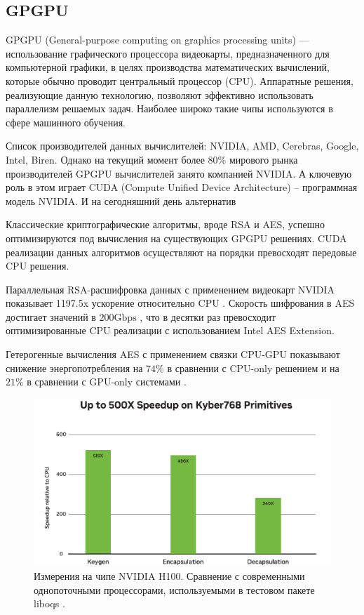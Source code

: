 \documentclass[a4paper,12pt]{article}
\begin{document}
\subsection{GPGPU}

GPGPU (General-purpose computing on graphics processing units) — использование графического процессора видеокарты, предназначенного для компьютерной графики, в целях производства математических вычислений, которые обычно проводит центральный процессор (CPU). Аппаратные решения, реализующие данную технологию, позволяют эффективно использовать параллелизм решаемых задач. Наиболее широко такие чипы используются в сфере машинного обучения.

Список производителей данных вычислителей: NVIDIA, AMD, Cerebras, Google, Intel, Biren. Однако на текущий момент более $80\%$ мирового рынка производителей GPGPU вычислителей занято компанией NVIDIA. А ключевую роль в этом играет CUDA (Compute Unified Device Architecture) -- программная модель NVIDIA. И на сегодняшний день альтернатив

Классические криптографические алгоритмы, вроде RSA и AES, успешно оптимизируются под вычисления на существующих GPGPU решениях. CUDA реализации данных алгоритмов осуществляют на порядки превосходят передовые CPU решения.

Параллельная RSA-расшифровка данных с применением видеокарт NVIDIA показывает 1197.5x ускорение относительно CPU \cite{RSA_CUDA}. Скорость шифрования в AES достигает значений в $200 \text{Gbps}$ \cite{AES_CUDA} \cite{AES_Pascal}, что в десятки раз превосходит оптимизированные CPU реализации с использованием Intel AES Extension. 

Гетерогенные вычисления AES с применением связки CPU-GPU показывают снижение энергопотребления на $74\%$ в сравнении с CPU-only решением и на $21\%$ в сравнении с GPU-only системами \cite{GPGPU_EnergyEfficiency}.

\begin{figure}[h]
	\centering
	\includegraphics[width=0.7\linewidth]{images/quantum-computing-cupqc}
	\caption{Измерения на чипе NVIDIA H100. Сравнение с современными однопоточными процессорами, используемыми в тестовом пакете liboqs \cite{cuPQC}.}
	\label{fig:quantum-computing-cupqc}
\end{figure}
    
\end{document}
